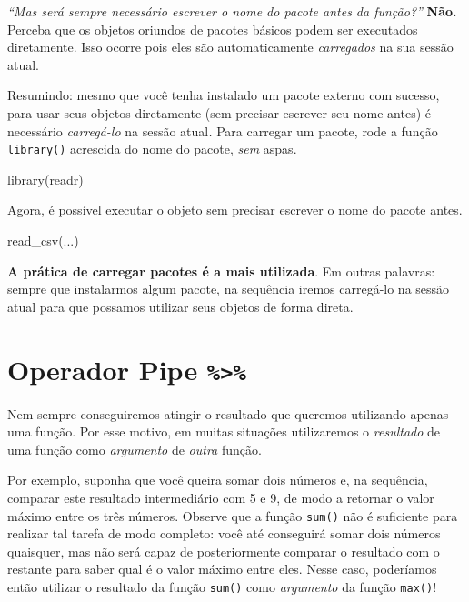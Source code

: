 \documentclass[
  letterpaper,
  DIV=11,
  numbers=noendperiod]{scrreprt}
\newenvironment{Shaded}{\begin{snugshade}}{\end{snugshade}}
\newcommand{\FunctionTok}[1]{\textcolor[rgb]{0.28,0.35,0.67}{#1}}
\newcommand{\NormalTok}[1]{\textcolor[rgb]{0.00,0.23,0.31}{#1}}
\begin{document}
\emph{``Mas será sempre necessário escrever o nome do pacote antes da
função?''} \textbf{Não.} Perceba que os objetos oriundos de pacotes
básicos podem ser executados diretamente. Isso ocorre pois eles são
automaticamente \emph{carregados} na sua sessão atual.

Resumindo: mesmo que você tenha instalado um pacote externo com sucesso,
para usar seus objetos diretamente (sem precisar escrever seu nome
antes) é necessário \emph{carregá-lo} na sessão atual\emph{.} Para
carregar um pacote, rode a função \texttt{library()} acrescida do nome
do pacote, \emph{sem} aspas.

\begin{Shaded}
\begin{Highlighting}[]
\FunctionTok{library}\NormalTok{(readr)}
\end{Highlighting}
\end{Shaded}

Agora, é possível executar o objeto sem precisar escrever o nome do
pacote antes.

\begin{Shaded}
\begin{Highlighting}[]
\FunctionTok{read\_csv}\NormalTok{(...)}
\end{Highlighting}
\end{Shaded}

\textbf{A prática de carregar pacotes é a mais utilizada}. Em outras
palavras: sempre que instalarmos algum pacote, na sequência iremos
carregá-lo na sessão atual para que possamos utilizar seus objetos de
forma direta.

\section{\texorpdfstring{Operador Pipe
\texttt{\%\textgreater{}\%}}{Operador Pipe \%\textgreater\%}}\label{operador-pipe}

Nem sempre conseguiremos atingir o resultado que queremos utilizando
apenas uma função. Por esse motivo, em muitas situações utilizaremos o
\emph{resultado} de uma função como \emph{argumento} de \emph{outra}
função.

Por exemplo, suponha que você queira somar dois números e, na sequência,
comparar este resultado intermediário com 5 e 9, de modo a retornar o
valor máximo entre os três números. Observe que a função \texttt{sum()}
não é suficiente para realizar tal tarefa de modo completo: você até
conseguirá somar dois números quaisquer, mas não será capaz de
posteriormente comparar o resultado com o restante para saber qual é o
valor máximo entre eles. Nesse caso, poderíamos então utilizar o
resultado da função \texttt{sum()} como \emph{argumento} da função
\texttt{max()}!
\end{document}
